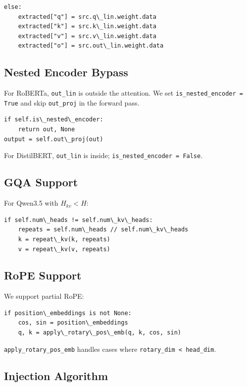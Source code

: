 \begin{lstlisting}
else:
    extracted["q"] = src.q\_lin.weight.data
    extracted["k"] = src.k\_lin.weight.data
    extracted["v"] = src.v\_lin.weight.data
    extracted["o"] = src.out\_lin.weight.data
\end{lstlisting}

\subsection{Nested Encoder Bypass}

For RoBERTa, \texttt{out\_lin} is outside the attention. We set 
\texttt{is\_nested\_encoder = True} and skip \texttt{out\_proj} in the forward pass.

\begin{lstlisting}
if self.is\_nested\_encoder:
    return out, None
output = self.out\_proj(out)
\end{lstlisting}

For DistilBERT, \texttt{out\_lin} is inside; \texttt{is\_nested\_encoder = False}.

\subsection{GQA Support}

For Qwen3.5 with $H_{kv} < H$:

\begin{lstlisting}
if self.num\_heads != self.num\_kv\_heads:
    repeats = self.num\_heads // self.num\_kv\_heads
    k = repeat\_kv(k, repeats)
    v = repeat\_kv(v, repeats)
\end{lstlisting}

\subsection{RoPE Support}

We support partial RoPE:

\begin{lstlisting}
if position\_embeddings is not None:
    cos, sin = position\_embeddings
    q, k = apply\_rotary\_pos\_emb(q, k, cos, sin)
\end{lstlisting}

\texttt{apply\_rotary\_pos\_emb} handles cases where \texttt{rotary\_dim \textless{} head\_dim}.

\subsection{Injection Algorithm}


